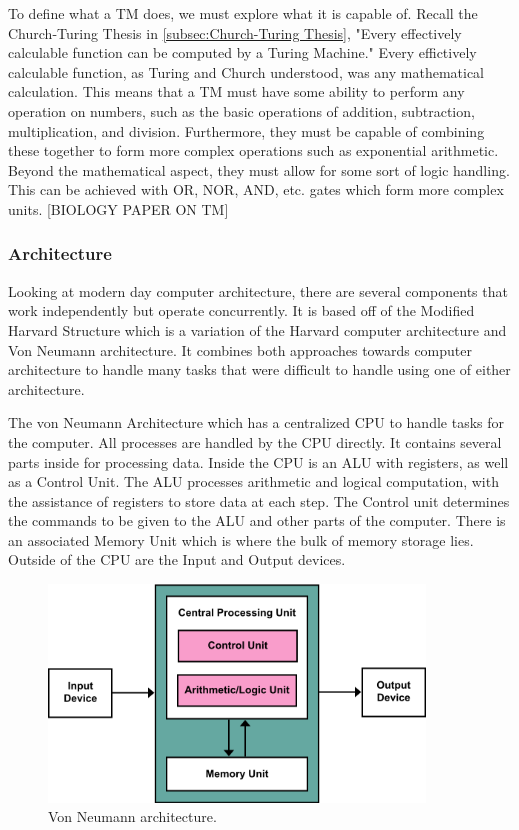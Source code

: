 To define what a TM does, we must explore what it is capable of.
Recall the Church-Turing Thesis in \ref{subsec:Church-Turing Thesis}, "Every effectively calculable function can be computed by a Turing Machine."
Every effictively calculable function, as Turing and Church understood, was any mathematical calculation.
This means that a TM must have some ability to perform any operation on numbers, such as the basic operations of addition, subtraction, multiplication, and division.
Furthermore, they must be capable of combining these together to form more complex operations such as exponential arithmetic.
Beyond the mathematical aspect, they must allow for some sort of logic handling.
This can be achieved with OR, NOR, AND, etc. gates which form more complex units.
[BIOLOGY PAPER ON TM]

\subsubsection{Architecture}

Looking at modern day computer architecture, there are several components that work independently but operate concurrently.
It is based off of the Modified Harvard Structure which is a variation of the Harvard computer architecture and Von Neumann architecture.
It combines both approaches towards computer architecture to handle many tasks that were difficult to handle using one of either architecture.

The von Neumann Architecture which has a centralized CPU to handle tasks for the computer.
All processes are handled by the CPU directly.
It contains several parts inside for processing data.
Inside the CPU is an ALU with registers, as well as a Control Unit.
The ALU processes arithmetic and logical computation, with the assistance of registers to store data at each step.
The Control unit determines the commands to be given to the ALU and other parts of the computer.
There is an associated Memory Unit which is where the bulk of memory storage lies.
Outside of the CPU are the Input and Output devices.

\begin{figure}[htb]
    \centering
    \includegraphics[width=10cm]{Images/Von_Neumann_Architecture.png}
       \caption{Von Neumann architecture.}
           \label{Fig:VonNeumannArch}
\end{figure}

